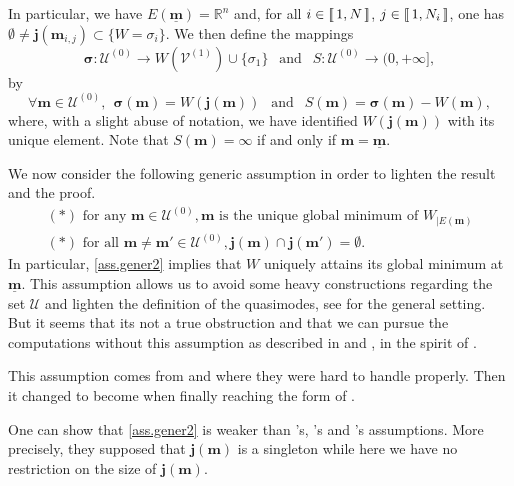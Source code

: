 \documentclass[12pt]{amsart}
\newcommand{\R}{\mathbb R}
\newcommand{\bsigma}{\boldsymbol{\sigma}}
\numberwithin{equation}{section}
\numberwithin{figure}{section}
\def\m{\mathbf{m}}
\def\j{\mathbf{j}}
\def\um{\underline{\m}}
\newcommand{\lb}{\operatorname{[\negthinspace [}}
\newcommand{\rb}{\operatorname{]\negthinspace ]}}
\def\uuu{{\mathcal U}}\def\vvv{{\mathcal V}}\def\www{{\mathcal W}}\def\xxx{{\mathcal X}}
\begin{document}
In particular, we have $E(\um) = \R^n$ and, for all $i\in\lb1,N\rb$, $j\in\lb1,N_i\rb$, one has $\emptyset\neq\j(\m_{i,j})\subset\{W=\sigma_i\}$. We then define the mappings
\begin{equation*}
\bsigma:\uuu^{(0)}\to W(\vvv^{(1)})\cup\{\sigma_1\}\ \ \mbox{ and }\ \ S:\uuu^{(0)}\to(0,+\infty],
\end{equation*}
by
\begin{equation}\label{eq:defS}
\forall \m\in\uuu^{(0)},\ \ \bsigma(\m) = W(\j(\m))\ \ \mbox{ and }\ \ S(\m) = \bsigma(\m) - W(\m),
\end{equation}
where, with a slight abuse of notation, we have identified $W(\j(\m))$ with its unique element. Note that $S(\m) = \infty$ if and only if $\m = \um$. 

We now consider the following generic assumption in order to lighten the result and the proof.
\begin{equation}\label{ass.gener2}\tag{Gener}
\begin{array}{l}
    (\ast)\mbox{ for any }\m\in\uuu^{(0)},\m \mbox{ is the unique global minimum of } W_{|E(\m)}\\
    (\ast)\mbox{ for all }\m\neq\m'\in\uuu^{(0)},\j(\m)\cap\j(\m')=\emptyset.
\end{array}
\end{equation}
In particular, \eqref{ass.gener2} implies that $W$ uniquely attains its global minimum at $\um$. This assumption allows us to avoid some heavy constructions regarding the set $\uuu$ and lighten the definition of the quasimodes, see \cite{Mi19} for the general setting. But it seems that its not a true obstruction and that we can pursue the computations without this assumption as described in \cite[Section 6]{BoLePMi22} and \cite{No24}, in the spirit of \cite{Mi19}.

This assumption comes from \cite[(1.7)]{BoGaKl05_01} and \cite[Assumption 3.8]{HeKlNi04_01} where they were hard to handle properly. Then it changed to become \cite[Hypothesis 5.1]{HeHiSj11_01} when finally reaching the form of \cite[Assumption 4]{LePMi20}.

One can show that \eqref{ass.gener2} is weaker than \cite{BoGaKl05_01}'s, \cite{HeKlNi04_01}'s and \cite{HeHiSj11_01}'s assumptions. More precisely, they supposed that $\j(\m)$ is a singleton while here we have no restriction on the size of $\j(\m)$.
\end{document}
